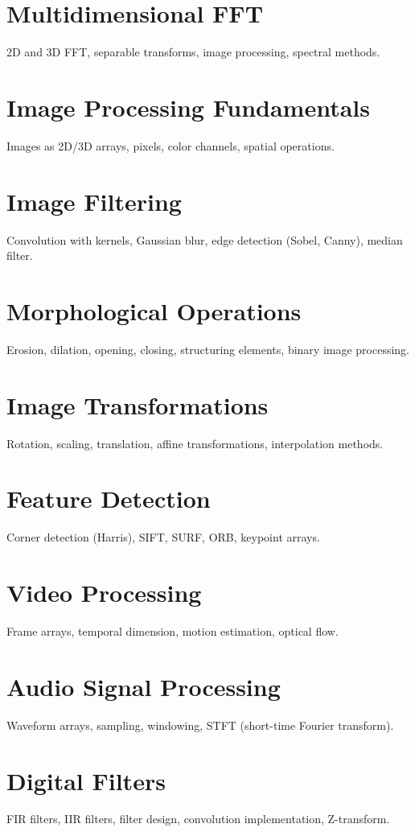 \chapter{Multidimensional FFT}
2D and 3D FFT, separable transforms, image processing, spectral methods.

\chapter{Image Processing Fundamentals}
Images as 2D/3D arrays, pixels, color channels, spatial operations.

\chapter{Image Filtering}
Convolution with kernels, Gaussian blur, edge detection (Sobel, Canny), median filter.

\chapter{Morphological Operations}
Erosion, dilation, opening, closing, structuring elements, binary image processing.

\chapter{Image Transformations}
Rotation, scaling, translation, affine transformations, interpolation methods.

\chapter{Feature Detection}
Corner detection (Harris), SIFT, SURF, ORB, keypoint arrays.

\chapter{Video Processing}
Frame arrays, temporal dimension, motion estimation, optical flow.

\chapter{Audio Signal Processing}
Waveform arrays, sampling, windowing, STFT (short-time Fourier transform).

\chapter{Digital Filters}
FIR filters, IIR filters, filter design, convolution implementation, Z-transform.

